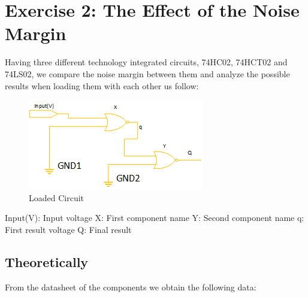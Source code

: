 



%
%
%

\section{\color{olive}Exercise 2: The Effect of the Noise Margin}

Having three different technology integrated circuits, 74HC02, 74HCT02 and 74LS02, we compare the noise margin between them and analyze the possible results when loading them with each other us follow:

\begin{figure}[h!]
        \centering
        \includegraphics[scale=0.7]{circuit2.png}
        \caption{\color{cyan}Loaded Circuit}
        \label{fig:ej2cir}
\end{figure}
Input(V): Input voltage
X: First component name
Y: Second component name
q: First result voltage
Q: Final result

	\subsection{\color{purple}Theoretically}
	 From the datasheet of the components we obtain the following data:
	 
